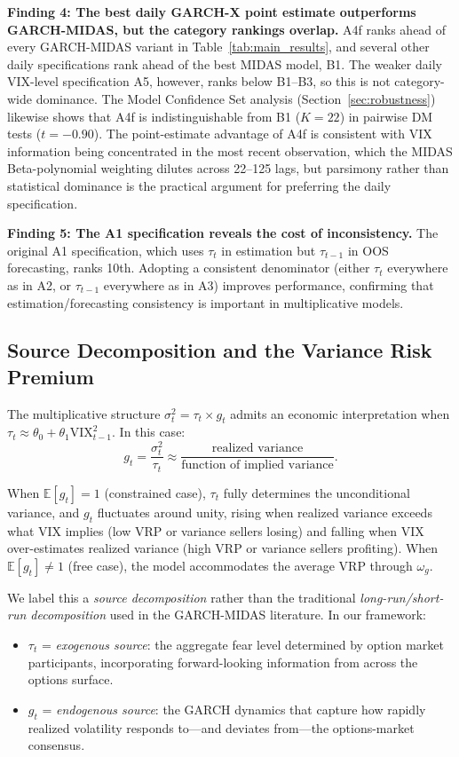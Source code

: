 \documentclass[12pt,a4paper]{article}
\newcommand{\E}{\mathbb{E}}
\begin{document}
\textbf{Finding 4: The best daily GARCH-X point estimate outperforms GARCH-MIDAS, but the category rankings overlap.} A4f ranks ahead of every GARCH-MIDAS variant in Table~\ref{tab:main_results}, and several other daily specifications rank ahead of the best MIDAS model, B1. The weaker daily VIX-level specification A5, however, ranks below B1--B3, so this is not category-wide dominance. The Model Confidence Set analysis (Section~\ref{sec:robustness}) likewise shows that A4f is indistinguishable from B1 ($K=22$) in pairwise DM tests ($t = -0.90$). The point-estimate advantage of A4f is consistent with VIX information being concentrated in the most recent observation, which the MIDAS Beta-polynomial weighting dilutes across 22--125 lags, but parsimony rather than statistical dominance is the practical argument for preferring the daily specification.

\textbf{Finding 5: The A1 specification reveals the cost of inconsistency.} The original A1 specification, which uses $\tau_t$ in estimation but $\tau_{t-1}$ in OOS forecasting, ranks 10th. Adopting a consistent denominator (either $\tau_t$ everywhere as in A2, or $\tau_{t-1}$ everywhere as in A3) improves performance, confirming that estimation/forecasting consistency is important in multiplicative models.

\subsection{Source Decomposition and the Variance Risk Premium}
\label{sec:vrp}

The multiplicative structure $\sigma_t^2 = \tau_t \times g_t$ admits an economic interpretation when $\tau_t \approx \theta_0 + \theta_1 \mathrm{VIX}_{t-1}^2$. In this case:
\begin{equation}
g_t = \frac{\sigma_t^2}{\tau_t} \approx \frac{\text{realized variance}}{\text{function of implied variance}}.
\label{eq:g_vrp}
\end{equation}

When $\E[g_t] = 1$ (constrained case), $\tau_t$ fully determines the unconditional variance, and $g_t$ fluctuates around unity, rising when realized variance exceeds what VIX implies (low VRP or variance sellers losing) and falling when VIX over-estimates realized variance (high VRP or variance sellers profiting). When $\E[g_t] \neq 1$ (free case), the model accommodates the average VRP through $\omega_g$.

We label this a \emph{source decomposition} rather than the traditional \emph{long-run/short-run decomposition} used in the GARCH-MIDAS literature. In our framework:
\begin{itemize}
\item $\tau_t$ = \emph{exogenous source}: the aggregate fear level determined by option market participants, incorporating forward-looking information from across the options surface.
\item $g_t$ = \emph{endogenous source}: the GARCH dynamics that capture how rapidly realized volatility responds to---and deviates from---the options-market consensus.
\end{itemize}
\end{document}
